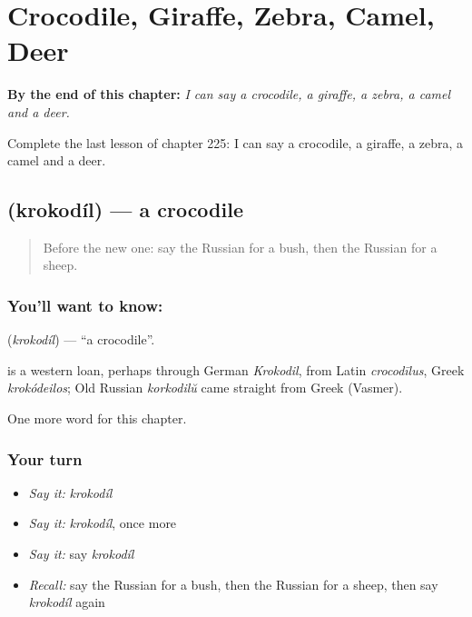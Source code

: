 
\chapter{Crocodile, Giraffe, Zebra, Camel, Deer}
\label{ch:ru-crocodile-giraffe-zebra-camel-deer}

\begin{chapteropening}
\textbf{By the end of this chapter:} \emph{I can say a crocodile, a giraffe, a zebra, a camel and a deer.}

Complete the last lesson of chapter 225: I can say a crocodile, a giraffe, a zebra, a camel and a deer.
\end{chapteropening}

\section[\texorpdfstring{\ru{крокодил} (krokodíl)}{крокодил (krokodíl)}]{ (krokodíl) — a crocodile}

\label{lesson:RU-C225-krokodil}



\begin{quote}
Before the new one: say the Russian for a bush, then the Russian for a sheep.
\end{quote}

\subsection*{You'll want to know: }
\textbf{} (\emph{krokodíl}) — \textquotedblleft{}a crocodile\textquotedblright{}.

\begin{cousinweb}
\textbf{} is a western loan, perhaps through German \emph{Krokodil}, from Latin \emph{crocodīlus}, Greek \emph{krokódeilos}; Old Russian \emph{korkodilŭ} came straight from Greek (Vasmer).
\end{cousinweb}

\begin{grammarlens}[title={What you've built}]
One more word for this chapter.
\end{grammarlens}

\subsection*{Your turn}
\begin{itemize}
\raggedright
  \item \emph{Say it:} \emph{krokodíl}
  \item \emph{Say it:} \emph{krokodíl}, once more
  \item \emph{Say it:} say \emph{krokodíl}
  \item \emph{Recall:} say the Russian for a bush, then the Russian for a sheep, then say \emph{krokodíl} again
\end{itemize}

